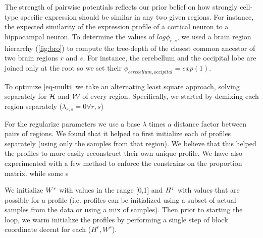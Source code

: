 The strength of pairwise potentials reflects our prior belief on how strongly cell-type specific expression should be similar in any two given regions. For instance, the expected similarity of the expression profile of a cortical neuron to a hippocampal neuron.
To determine the values of $log \phi_{r,s}$, we used a brain region hierarchy (\ref{fig:bro}) to compute the tree-depth of the closest common ancestor of two brain regions $r$ and $s$. For instance, the cerebellum and the occipital lobe are joined only at the root so we set their $\phi_{cerebellum, occipital} = exp(1)$. 


To optimize \eqref{eq-multi} we take an alternating least square approach, solving separately for ${\cal{{H}}}$ and ${\cal{W}}$ of every region. Specifically, we started by demixing each region separately ($\lambda_{r,s}=0 \forall r,s$)


For the regularize parameters we use a base $\lambda$ times a distance factor between pairs of regions. We found that it helped to first initialize each of profiles separately (using only the samples from that region). We believe that this helped the profiles to more easily reconstruct their own unique profile. We have also experimented with a few method to enforce the constrains on the proportion matrix. while some s

We initialize $W^r$ with values in the range [0,1] and ${H}^r$ with values that are possible for a profile (i.e. profiles can be initialized using a subset of actual samples from the data or using a mix of samples). Then prior to starting the loop, we warm initialize the profiles by performing a single step of block coordinate decent for each ($H^r,W^r$).


